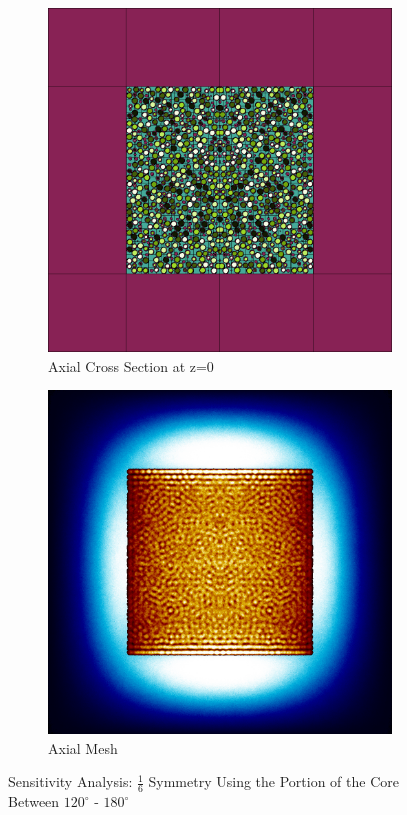 \begin{figure}[H]
\begin{subfigure}{0.45\textwidth}
  \includegraphics[width=0.95\linewidth]{figures/120-180/120-180-v}
  \caption{Axial Cross Section at z=0 }
  \label{fig:120-180-v}
\end{subfigure}
%
\begin{subfigure}{0.45\textwidth}
  \includegraphics[width=0.95\linewidth]{figures/120-180/120-180-vm}
  \caption{Axial Mesh}
  \label{fig:120-180-vm}
\end{subfigure}
%
\caption{Sensitivity Analysis: $\frac{1}{6}$ Symmetry Using the Portion of the Core Between $120^{\circ}$ - $180^{\circ}$}
\label{fig:120-180}
\end{figure}